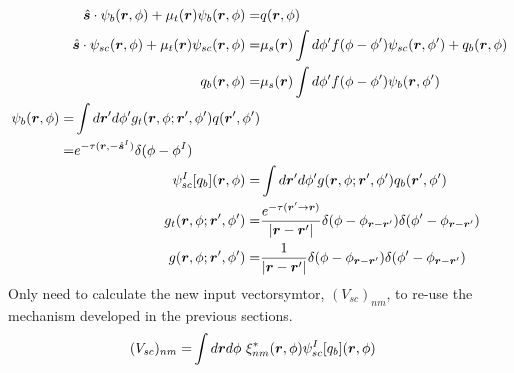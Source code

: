 \documentclass [10pt,letterpaper]{article}
\newcommand{\unitvectorsym}[1]{\hat{\vectorsym{#1}}}
\begin{document}
\begin{subequations} \label{eq:def-psib-psisc-qb-psiscI-result-psib-exp-gf-gft}
	\begin{align}
		\unitvectorsym{s}
		\cdot 
		\psi_b(\vectorsym{r},\phi)
		+
		\mu_t(\vectorsym{r})
		\psi_b(\vectorsym{r},\phi)
		=&
		q(\vectorsym{r},\phi)
		\label{eq:def-psib-2d}
		\\
		\unitvectorsym{s}
		\cdot 
		\psi_{sc}(\vectorsym{r},\phi)
		+
		\mu_t(\vectorsym{r})
		\psi_{sc}(\vectorsym{r},\phi)
		=&
		\mu_s(\vectorsym{r})
		\int d\phi^\prime
		f(\phi-\phi^\prime)
		\psi_{sc}(\vectorsym{r},\phi^\prime)
		+
		q_b(\vectorsym{r},\phi)
		\label{eq:def-psisc-2d}
		\\
		q_b(\vectorsym{r},\phi)
		=&
		\mu_s(\vectorsym{r})
		\int d\phi^\prime
		f(\phi-\phi^\prime)
		\psi_b(\vectorsym{r},\phi^\prime) 
		\label{eq:def-qb-2d}
		\\
		\begin{split}
			\label{eq:result-psib-2d}
			\psi_b(\vectorsym{r},\phi)
			=&
			\int d\vectorsym{r}^\prime d\phi^\prime
			g_t(\vectorsym{r},\phi;\vectorsym{r}^\prime,\phi^\prime) 
			q(\vectorsym{r}^\prime,\phi^\prime)
			\\
			=&
			e^{-\tau(\vectorsym{r},-\unitvectorsym{s}^I)}
			\delta(\phi-\phi^I) 
		\end{split} 
		\\
		\psi_{sc}^I[q_b](\vectorsym{r},\phi)
		=&
		\int d\vectorsym{r}^\prime d\phi^\prime
		g(\vectorsym{r},\phi;\vectorsym{r}^\prime,\phi^\prime)
		q_b(\vectorsym{r}^\prime,\phi^\prime)
		\label{eq:def-psiscI-2d} 
		\\
		g_t(\vectorsym{r},\phi;\vectorsym{r}^\prime,\phi^\prime)
		=&
		\frac
		{e^{-\tau(\vectorsym{r}^\prime\to\vectorsym{r})}}
		{\lvert \vectorsym{r}-\vectorsym{r}^\prime \rvert}
		\delta(\phi-\phi_{\vectorsym{r}-\vectorsym{r}^\prime})
		\delta(\phi^\prime-\phi_{\vectorsym{r}-\vectorsym{r}^\prime})
		\label{eq:exp-gft-2d} 
		\\
		g(\vectorsym{r},\phi;\vectorsym{r}^\prime,\phi^\prime)
		=&
		\frac
		{1}
		{\lvert \vectorsym{r}-\vectorsym{r}^\prime \rvert}
		\delta(\phi-\phi_{\vectorsym{r}-\vectorsym{r}^\prime})
		\delta(\phi^\prime-\phi_{\vectorsym{r}-\vectorsym{r}^\prime})
		\label{eq:exp-gf-2d} 
	\end{align}
\end{subequations}
Only need to calculate the new input vectorsymtor, $(V_{sc})_{n m}$, to re-use the mechanism developed in the previous sections.
\begin{equation} \label{eq:def-Vscnm-1pt}
	\begin{split}
		(V_{sc})_{n m}
		=&
		\int d\vectorsym{r} d\phi
		\ \xi^*_{n m}
		(\vectorsym{r},\phi)
		\psi_{sc}^I
		[q_b]
		(\vectorsym{r},\phi) 
	\end{split}
\end{equation}
\end{document}
